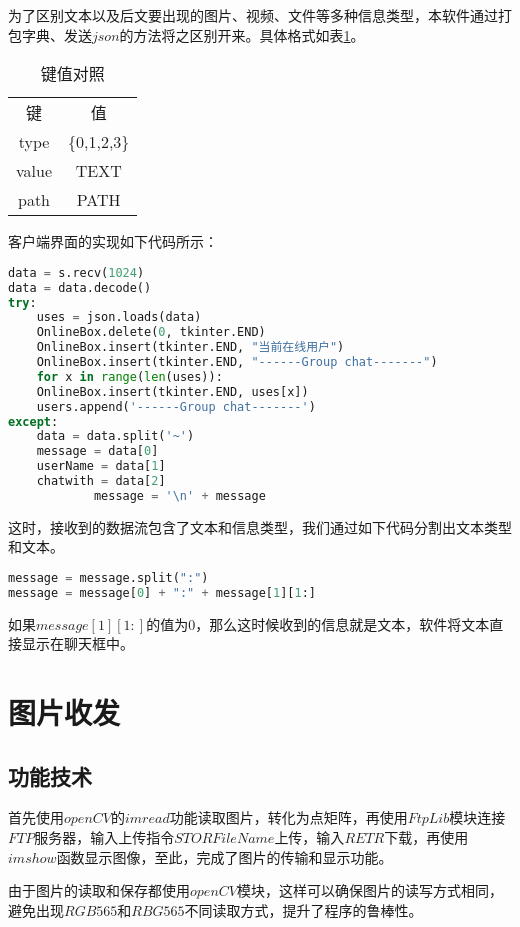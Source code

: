\documentclass[forprint]{OSPaper}
\begin{document}
为了区别文本以及后文要出现的图片、视频、文件等多种信息类型，本软件通过打包字典、发送$json$的方法将之区别开来。具体格式如表\ref{table:5}。

\begin{table}[!htbp]
	\centering
	\caption{键值对照}
	\begin{tabular}{cc}
		\hline
		键     & 值           \\
		type  & \{0,1,2,3\} \\
		value & TEXT      \\
		path  & PATH     \\ \hline
	\end{tabular}
	\label{table:5}
\end{table}

客户端界面的实现如下代码所示：
\begin{lstlisting}[language=Python]
data = s.recv(1024)
data = data.decode()
try:
	uses = json.loads(data)
	OnlineBox.delete(0, tkinter.END)
	OnlineBox.insert(tkinter.END, "当前在线用户")
	OnlineBox.insert(tkinter.END, "------Group chat-------")
	for x in range(len(uses)):
	OnlineBox.insert(tkinter.END, uses[x])
	users.append('------Group chat-------')
except:
	data = data.split('~')
	message = data[0]
	userName = data[1]
	chatwith = data[2]
            message = '\n' + message
\end{lstlisting} 

这时，接收到的数据流包含了文本和信息类型，我们通过如下代码分割出文本类型和文本。

\begin{lstlisting}[language=Python]
message = message.split(":")
message = message[0] + ":" + message[1][1:]
\end{lstlisting} 

如果$message[1][1:]$的值为0，那么这时候收到的信息就是文本，软件将文本直接显示在聊天框中。
\section{图片收发}

\subsection{功能技术}

首先使用$openCV$的$imread$功能读取图片，转化为点矩阵，再使用$FtpLib$模块连接$FTP$服务器，输入上传指令$STOR FileName$上传，输入$RETR$下载，再使用$imshow$函数显示图像，至此，完成了图片的传输和显示功能。

由于图片的读取和保存都使用$openCV$模块，这样可以确保图片的读写方式相同，避免出现$RGB565$和$RBG565$不同读取方式，提升了程序的鲁棒性。
\end{document}
